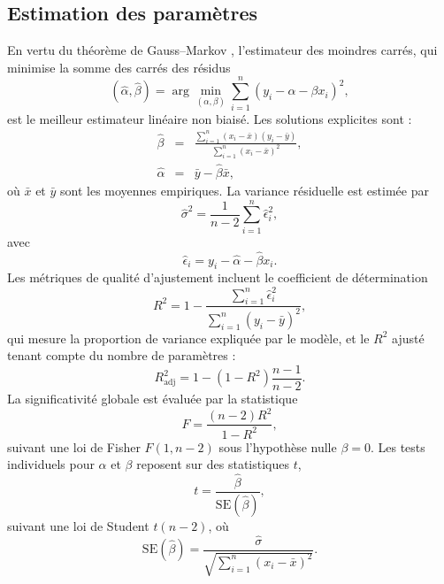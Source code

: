 \subsection{Estimation des paramètres}
En vertu du théorème de Gauss–Markov \citep{monahan2008primer}, l'estimateur des moindres carrés, qui minimise la somme des carrés des résidus
\begin{equation}
	\left(\hat{\alpha}, \hat{\beta}\right) = \arg\min_{\left(\alpha, \beta \right)} \sum_{i=1}^n (y_i - \alpha - \beta x_i)^2,
\end{equation}
est le meilleur estimateur linéaire non biaisé. Les solutions explicites sont :
\begin{eqnarray}
	\hat{\beta} &=& \frac{\sum_{i=1}^n (x_i - \bar{x})(y_i - \bar{y})}{\sum_{i=1}^n (x_i - \bar{x})^2}, \\
	\hat{\alpha} &=& \bar{y} - \hat{\beta} \bar{x},
\end{eqnarray}
où $\bar{x}$ et $\bar{y}$ sont les moyennes empiriques. La variance résiduelle est estimée par
\begin{equation}
	\hat{\sigma}^2 = \frac{1}{n-2} \sum_{i=1}^n \hat{\epsilon}_i^2,
\end{equation}
avec
\begin{equation}
	\hat{\epsilon}_i = y_i - \hat{\alpha} - \hat{\beta} x_i.
\end{equation}
Les métriques de qualité d'ajustement incluent le coefficient de détermination
\begin{equation}
	R^2 = 1 - \frac{\sum_{i=1}^n \hat{\epsilon}_i^2}{\sum_{i=1}^n (y_i - \bar{y})^2},
\end{equation}
qui mesure la proportion de variance expliquée par le modèle, et le $R^2$ ajusté tenant compte du nombre de paramètres :
\begin{equation}
	R^2_{\mathrm{adj}} = 1 - (1 - R^2) \frac{n-1}{n-2}.
\end{equation}
La significativité globale est évaluée par la statistique
\begin{equation}
	F = \frac{(n-2) R^2}{1 - R^2},
\end{equation}
suivant une loi de Fisher $F(1, n-2)$ sous l'hypothèse nulle $\beta = 0$. Les tests individuels pour $\alpha$ et $\beta$ reposent sur des statistiques $t$,
\begin{equation}
	t = \frac{\hat{\beta}}{\mathrm{SE}(\hat{\beta})},
\end{equation}
suivant une loi de Student $t(n-2)$, où
\begin{equation}
	\mathrm{SE}(\hat{\beta}) = \frac{\hat{\sigma}}{\sqrt{\sum_{i=1}^n (x_i - \bar{x})^2}}.
\end{equation}

